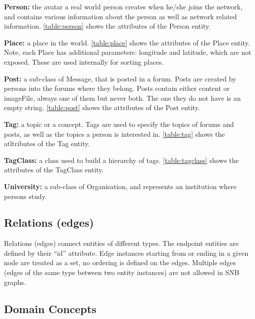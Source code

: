 {\flushleft \textbf{Person:}} the avatar a real world person creates
when he/she joins the network, and contains various information about the
person as well as network related information. \autoref{table:person} shows
the attributes of the Person entity.



{\flushleft \textbf{Place:}} a place in the world.
\autoref{table:place} shows the attributes of the Place entity. Note, each Place has additional parameters: longitude and latitude, which are not exposed. These are used internally for sorting places.



{\flushleft \textbf{Post:}} a sub-class of Message, that is posted in a
forum. Posts are created by persons into the forums where they belong.
Posts contain either content or imageFile, always one of them but never both.
The one they do not have is an empty string.
\autoref{table:post} shows the attributes of the Post entity.



{\flushleft \textbf{Tag:}} a topic or a concept. Tags are used to
specify the topics of forums and posts, as well as the topics a person is
interested in. \autoref{table:tag} shows the atltributes of the Tag entity.



{\flushleft \textbf{TagClass:}} a class used to build a hierarchy of tags. \autoref{table:tagclass} shows the attributes of the TagClass entity.



{\flushleft \textbf{University:}} a sub-class of Organisation,
and represents an institution where persons study.

\subsection{Relations (edges)}

Relations (edges) connect entities of different types. The endpoint entities are defined by their ``id'' attribute.
Edge instances starting from or ending in a given node are treated as a set, \ie no ordering is defined on the edges.
Multiple edges (\ie edges of the same type between two entity instances) are not allowed in SNB graphs.



\subsection{Domain Concepts}

